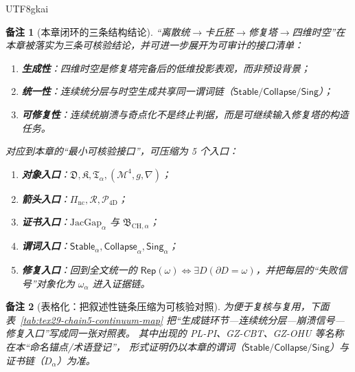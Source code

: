 \documentclass[12pt]{article}
\newtheorem{remark}{备注}[section]
\newcommand{\KouJing}{\texorpdfstring{表述约定}{表述约定}}
\begin{document}
\begin{CJK*}{UTF8}{gkai}
\begin{remark}[本章闭环的三条结构结论]
“离散统$\to$卡丘胚$\to$修复塔$\to$四维时空”在本章被落实为三条可核验结论，并可进一步展开为可审计的接口清单：
\begin{enumerate}
  \item \textbf{生成性}：四维时空是修复塔完备后的低维投影表观，而非预设背景；
  \item \textbf{统一性}：连续统分层与时空生成共享同一谓词链（$\mathsf{Stable}/\mathsf{Collapse}/\mathsf{Sing}$）；
  \item \textbf{可修复性}：连续统崩溃与奇点化不是终止判据，而是可继续输入修复塔的构造任务。
\end{enumerate}
对应到本章的“最小可核验接口”，可压缩为 5 个入口：
\begin{enumerate}
  \item \textbf{对象入口}：$\mathfrak{D},\mathfrak{K},\mathfrak{T}_{\alpha},(\mathcal{M}^4,g,\nabla)$；
  \item \textbf{箭头入口}：$\Pi_{\mathrm{nc}},\mathcal{R},\mathcal{P}_{\mathrm{4D}}$；
  \item \textbf{证书入口}：$\mathrm{JacGap}_{\alpha}$ 与 $\mathfrak{B}_{\mathrm{CH},\alpha}$；
  \item \textbf{谓词入口}：$\mathsf{Stable}_{\alpha},\mathsf{Collapse}_{\alpha},\mathsf{Sing}_{\alpha}$；
  \item \textbf{修复入口}：回到全文统一的 $\mathsf{Rep}(\omega)\Leftrightarrow \exists D(\partial D=\omega)$，并把每层的“失败信号”对象化为
    $\omega_{\alpha}$ 进入证据链。
\end{enumerate}
\end{remark}

\begin{remark}[表格化：把叙述性链条压缩为可核验对照]
为便于复核与复用，下面表~\ref{tab:tex29-chain5-continuum-map} 把“生成链环节—连续统分层—崩溃信号—修复入口”写成同一张对照表。
其中出现的 PL-PI、GZ-CBT、GZ-OHU 等名称在本“命名锚点/术语登记”，
形式证明仍以本章的谓词（$\mathsf{Stable}/\mathsf{Collapse}/\mathsf{Sing}$）与证书链（$D_{\alpha}$）为准。
\end{remark}


\end{CJK*}
\end{document}
